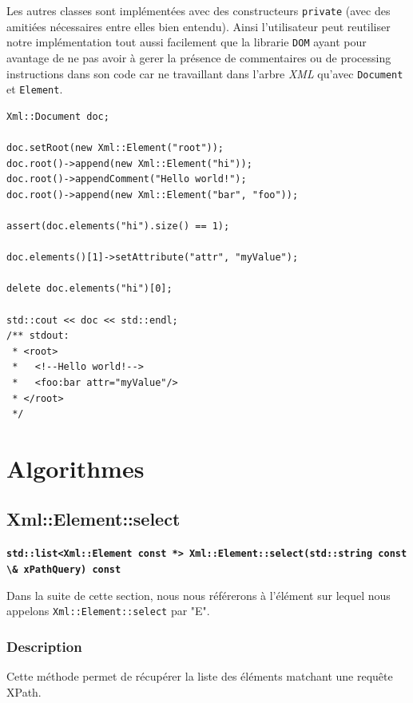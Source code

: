     Les autres classes sont impl\'ement\'ees avec des constructeurs \lstinline$private$ (avec des amiti\'ees n\'ecessaires entre elles bien entendu). Ainsi l'utilisateur peut reutiliser notre impl\'ementation tout aussi facilement que la librarie \lstinline$DOM$ ayant pour avantage de ne pas avoir \`a gerer la pr\'esence de commentaires ou de processing instructions dans son code car ne travaillant dans l'arbre \textit{XML} qu'avec \lstinline$Document$ et \lstinline$Element$.
    \\
    \begin{lstlisting}[frame=single]
Xml::Document doc;

doc.setRoot(new Xml::Element("root"));
doc.root()->append(new Xml::Element("hi"));
doc.root()->appendComment("Hello world!");
doc.root()->append(new Xml::Element("bar", "foo"));

assert(doc.elements("hi").size() == 1);

doc.elements()[1]->setAttribute("attr", "myValue");

delete doc.elements("hi")[0];

std::cout << doc << std::endl;
/** stdout:
 * <root>
 *   <!--Hello world!-->
 *   <foo:bar attr="myValue"/>
 * </root>
 */
    \end{lstlisting}


\section{Algorithmes}

    \subsection{Xml::Element::select}

    \textbf{\lstinline$std::list<Xml::Element const *> Xml::Element::select(std::string const \& xPathQuery) const$}

    Dans la suite de cette section, nous nous référerons à l'élément sur lequel nous appelons \lstinline$Xml::Element::select$ par "E".

    \subsubsection{Description}
    Cette méthode permet de récupérer la liste des éléments matchant une requête XPath.

